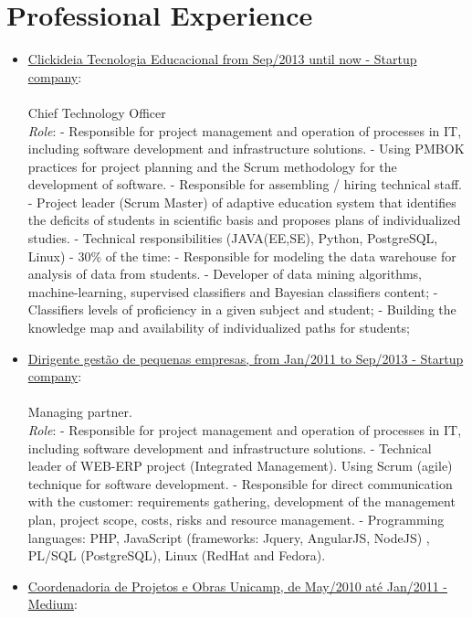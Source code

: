 \documentclass[a4paper,11pt]{article}
\begin{document}
\section{Professional Experience}
\begin{itemize}

\item \underline{Clickideia Tecnologia Educacional from Sep/2013 until now - Startup company}:\\
{\small \\ 
  Chief Technology Officer\\
  \emph{Role}: 
  \subitem - Responsible for project management and operation of processes in IT, including software development and infrastructure solutions.
  \subitem - Using PMBOK practices for project planning and the Scrum methodology for the development of software.
  \subitem - Responsible for assembling / hiring technical staff.
  \subitem - Project leader (Scrum Master) of adaptive education system that identifies the deficits of students in scientific basis and proposes plans of individualized studies.
  \subitem - Technical responsibilities (JAVA(EE,SE), Python, PostgreSQL, Linux) - 30\% of the time:
  \subsubitem - Responsible for modeling the data warehouse for analysis of data from students.
  \subsubitem - Developer of data mining algorithms, machine-learning, supervised classifiers and Bayesian classifiers content;
  \subsubitem - Classifiers levels of proficiency in a given subject and student;
  \subsubitem - Building the knowledge map and availability of individualized paths for students;
}
\item \underline{Dirigente gestão de pequenas empresas, from Jan/2011 to Sep/2013 - Startup company}: \\
{\small \\
  Managing partner.\\
  \emph{Role}: 
 \subitem - Responsible for project management and operation of processes in IT, including software development and infrastructure solutions.
 \subitem - Technical leader of WEB-ERP project (Integrated Management). Using Scrum (agile) technique for software development.
 \subitem - Responsible for direct communication with the customer: requirements gathering, development of the management plan, project scope, costs, risks and resource management.
 \subitem - Programming languages: PHP, JavaScript (frameworks: Jquery, AngularJS, NodeJS) , PL/SQL (PostgreSQL), Linux (RedHat and Fedora).\\
}
\item \underline{Coordenadoria de Projetos e Obras Unicamp, de May/2010 até Jan/2011 - Medium}:\\

\end{itemize}
\end{document}
